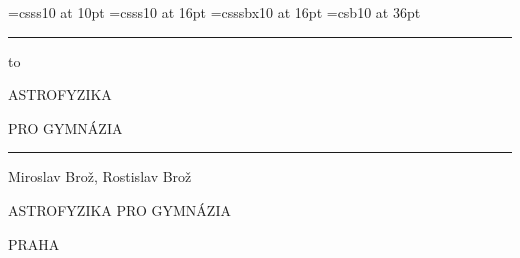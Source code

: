
\def\title#1{\global\def\booktitle{#1}}
\def\author#1{\global\def\bookauthor{#1}}

\font\MFx=csss10 at 10pt
\font\MFxvi=csss10 at 16pt
\font\MFxvibf=csssbx10 at 16pt
\font\MFxxxvib=csb10 at 36pt

\def\maketitle{%
  \hrule height 0pt%
  \vskip 1.25in
  \begingroup
  \baselineskip=19.2pt
  \centerline{\MFxvi\bookauthor}%
  \vskip 1.2\baselineskip
  \centerline{\MFxvibf\booktitle}%
  \endgroup
  \vfill
  \begingroup
  \MFx
  \vskip 0.6\baselineskip
  \centerline{PRAHA \the\year}
  \endgroup
  \par\eject
  \leavevmode\vfill\eject
}



\title{ASTROFYZIKA PRO GYMNÁZIA}
\author{Miroslav Brož, Rostislav Brož}

\nopagenumbers
\hrule height 0pt
\noindent\vskip-1.15in\hbox to
\begingroup
\baselineskip=19.2pt
\vskip 1.00in
\centerline{\MFxxxvib ASTROFYZIKA}%
\baselineskip
\centerline{\MFxxxvib PRO GYMNÁZIA}%
\vskip 1.00in
\endgroup
\vfill
\eject

\maketitle

\pagenumbers

\leavevmode
\vskip 5.00in
\vfill
\eject


